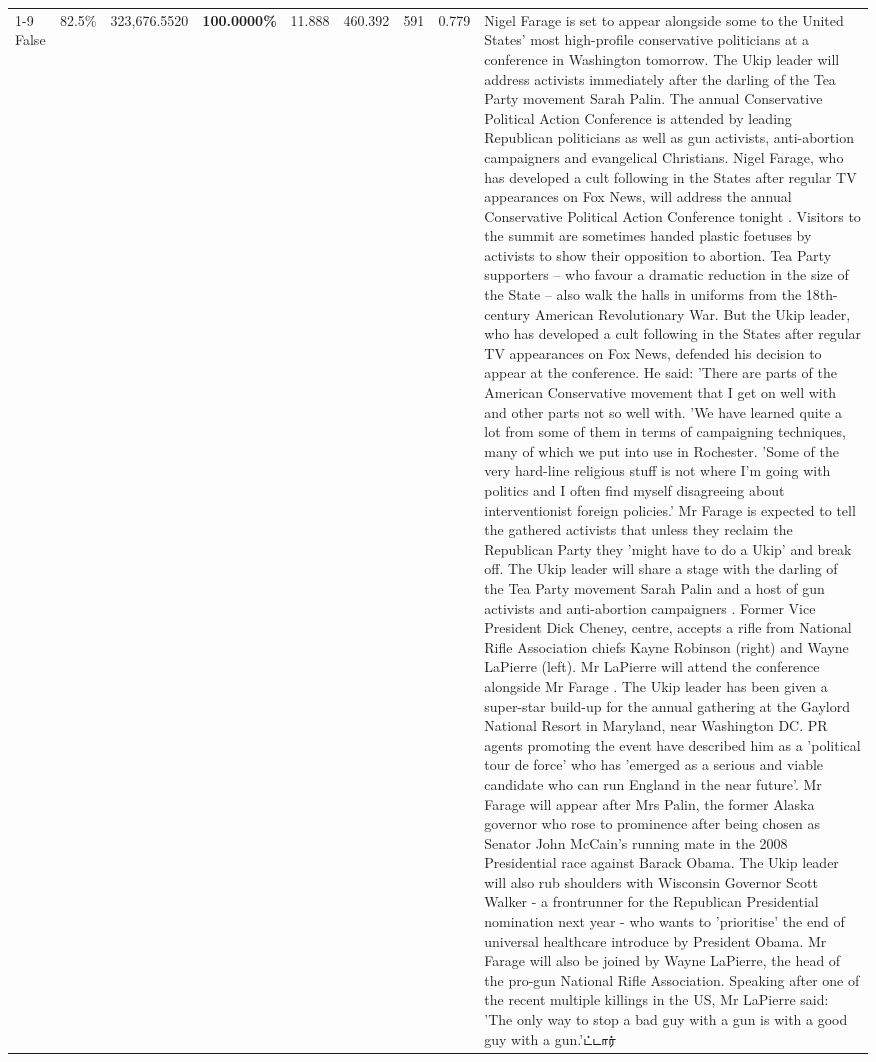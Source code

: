 \begin{table}[H]
\begin{tabular}{lllrlllll}
\cline{1-9}
False & 82.5\% & 323,676.5520 & \bfseries \color{red} 100.0000\% & 11.888 & 460.392 & 591 & 0.779 & Nigel Farage is set to appear alongside some to the United States' most high-profile conservative politicians at a conference in Washington tomorrow. The Ukip leader will address activists immediately after the darling of the Tea Party movement Sarah Palin. The annual Conservative Political Action Conference is attended by leading Republican politicians as well as gun activists, anti-abortion campaigners and evangelical Christians. Nigel Farage, who has developed a cult following in the States after regular TV appearances on Fox News, will address the annual Conservative Political Action Conference tonight . Visitors to the summit are sometimes handed plastic foetuses by activists to show their opposition to abortion. Tea Party supporters – who favour a dramatic reduction in the size of the State – also walk the halls in uniforms from the 18th-century American Revolutionary War. But the Ukip leader, who has developed a cult following in the States after regular TV appearances on Fox News, defended his decision to appear at the conference. He said: 'There are parts of the American Conservative movement that I get on well with and other parts not so well with. 'We have learned quite a lot from some of them in terms of campaigning techniques, many of which we put into use in Rochester. 'Some of the very hard-line religious stuff is not where I'm going with politics and I often find myself disagreeing about interventionist foreign policies.' Mr Farage is expected to tell the gathered activists that unless they reclaim the Republican Party they 'might have to do a Ukip' and break off. The Ukip leader will share a stage with the darling of the Tea Party movement Sarah Palin and a host of gun activists and anti-abortion campaigners . Former Vice President Dick Cheney, centre, accepts a rifle from National Rifle Association chiefs Kayne Robinson (right) and Wayne LaPierre (left). Mr LaPierre will attend the conference alongside Mr Farage . The Ukip leader has been given a super-star build-up for the annual gathering at the Gaylord National Resort in Maryland, near Washington DC. PR agents promoting the event have described him as a 'political tour de force' who has 'emerged as a serious and viable candidate who can run England in the near future'. Mr Farage will appear after Mrs Palin, the former Alaska governor who rose to prominence after being chosen as Senator John McCain's running mate in the 2008 Presidential race against Barack Obama. The Ukip leader will also rub shoulders with Wisconsin Governor Scott Walker - a frontrunner for the Republican Presidential nomination next year - who wants to 'prioritise' the end of universal healthcare introduce by President Obama. Mr Farage will also be joined by Wayne LaPierre, the head of the pro-gun National Rifle Association. Speaking after one of the recent multiple killings in the US, Mr LaPierre said: 'The only way to stop a bad guy with a gun is with a good guy with a gun.'ட்டார் \\

\end{tabular}
\end{table}
